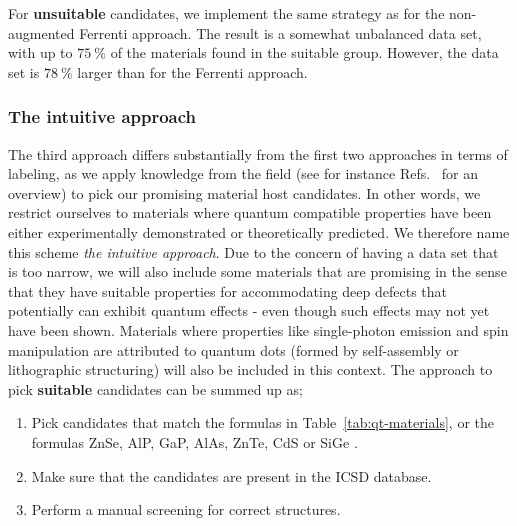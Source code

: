 \documentclass[superscriptaddress,unsortedaddress,
 amsmath,amssymb,
 aps,
]{revtex4-2}
\begin{document}
For \textbf{unsuitable} candidates, we implement the same strategy as for the non-augmented Ferrenti approach. The result is a somewhat unbalanced data set, with up to $75 \ \%$ of the 
materials found in the suitable group. However, the data set is $78 \ \%$ larger than for the Ferrenti approach.

\subsubsection*{The intuitive approach}
The third approach differs substantially from the first two approaches in terms of labeling, as we apply knowledge from the field (see for instance Refs.~\cite{Atatuere2018,Zhang2020,Son2020,Toth2019,Bathen2021} for an overview)   
to pick our promising material host candidates. 
In other words, we restrict ourselves to materials where quantum compatible properties have been either experimentally demonstrated or theoretically predicted. 
We therefore name this scheme \emph{the intuitive approach}. Due to the concern of having a data set that is too narrow, we will also include some  materials that are promising in the sense that they have suitable properties for accommodating  deep defects that potentially can exhibit quantum effects - even though such effects may not yet have been shown. 
Materials where properties like single-photon emission and spin manipulation are attributed to quantum dots (formed by self-assembly or lithographic structuring) will also be included in this context.  
The approach to pick \textbf{suitable} candidates can be summed up as;   
\begin{enumerate}
    \item Pick candidates that match the formulas in Table~\ref{tab:qt-materials}, or the formulas ZnSe, AlP, GaP, AlAs, ZnTe, CdS \cite{Weber2010} or SiGe \cite{Hardy2019}. 
    \item Make sure that the candidates are present in the ICSD database.  
    \item Perform a manual screening for correct structures. 
\end{enumerate}
\end{document}
